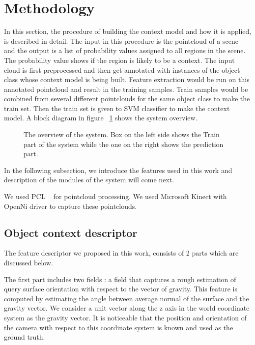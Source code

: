 \section{Methodology}
\label{Implementation.sec}

In this section, the procedure of building the context model and how it is applied, is described in detail. 
The input in this procedure is the pointcloud of a scene and the output is a list of probability values assigned to all regions in
the scene. 
The probability value shows if the region is likely to be a context. 
The input cloud is first preprocessed and then get annotated with instances of the object class whose context model is being built. 
Feature extraction would be run on this annotated pointcloud and result in the training samples. 
Train samples would be combined from several different pointclouds for the same object class to make the train set. 
Then the train set is given to SVM classifier to make the context model. A block diagram in figure ~\ref{SystemOverview.figure} shows 
the system overview.

\begin{figure}[t]
  \caption[System Overview]
  {The overview of the system. Box on the left side shows the Train part of the system while the one on the right shows the prediction part.}
  \label{SystemOverview.figure}
\end{figure}

In the following subsection, we introduce the features used in this work and description of the modules of the system 
will come next.

We used PCL ~\cite{Rusu_ICRA2011_PCL} for pointcloud processing. 
We used Microsoft Kinect with OpenNi driver to capture these pointclouds. 

\subsection{Object context descriptor}
\label{OCD.ssec}

The feature descriptor we proposed in this work, consists of 2 parts which are discussed below.

The first part includes two fields :
a field that captures a rough estimation of query surface orientation with respect to the vector of gravity.
This feature is computed by estimating the angle between average normal of the surface and the gravity vector.
We consider a unit vector along the z axis in the world coordinate system as the gravity vector.
It is noticeable that the position and orientation of the camera with respect to this coordinate system is known and used as
the ground truth.

